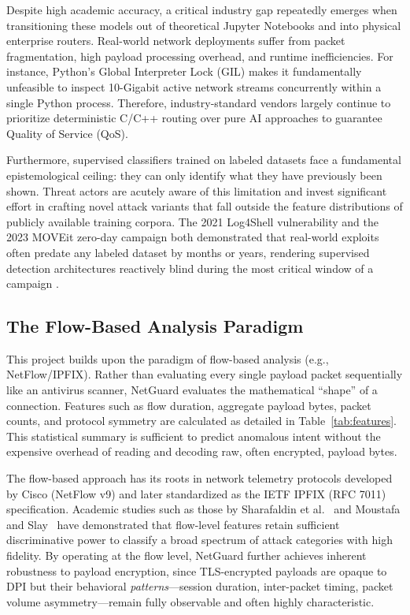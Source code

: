 \documentclass[conference]{IEEEtran}
\begin{document}
Despite high academic accuracy, a critical industry gap repeatedly emerges when transitioning these models out of theoretical Jupyter Notebooks and into physical enterprise routers. Real-world network deployments suffer from packet fragmentation, high payload processing overhead, and runtime inefficiencies. For instance, Python's Global Interpreter Lock (GIL) makes it fundamentally unfeasible to inspect 10-Gigabit active network streams concurrently within a single Python process. Therefore, industry-standard vendors largely continue to prioritize deterministic C/C++ routing over pure AI approaches to guarantee Quality of Service (QoS).

Furthermore, supervised classifiers trained on labeled datasets face a fundamental epistemological ceiling: they can only identify what they have previously been shown. Threat actors are acutely aware of this limitation and invest significant effort in crafting novel attack variants that fall outside the feature distributions of publicly available training corpora. The 2021 Log4Shell vulnerability and the 2023 MOVEit zero-day campaign both demonstrated that real-world exploits often predate any labeled dataset by months or years, rendering supervised detection architectures reactively blind during the most critical window of a campaign \cite{ring2019, hindy2020}.

\subsection{The Flow-Based Analysis Paradigm}
This project builds upon the paradigm of flow-based analysis (e.g., NetFlow/IPFIX). Rather than evaluating every single payload packet sequentially like an antivirus scanner, NetGuard evaluates the mathematical ``shape'' of a connection. Features such as flow duration, aggregate payload bytes, packet counts, and protocol symmetry are calculated as detailed in Table~\ref{tab:features}. This statistical summary is sufficient to predict anomalous intent without the expensive overhead of reading and decoding raw, often encrypted, payload bytes.

The flow-based approach has its roots in network telemetry protocols developed by Cisco (NetFlow v9) and later standardized as the IETF IPFIX (RFC 7011) specification. Academic studies such as those by Sharafaldin et al.~\cite{sharafaldin2018} and Moustafa and Slay~\cite{moustafa2015} have demonstrated that flow-level features retain sufficient discriminative power to classify a broad spectrum of attack categories with high fidelity. By operating at the flow level, NetGuard further achieves inherent robustness to payload encryption, since TLS-encrypted payloads are opaque to DPI but their behavioral \emph{patterns}---session duration, inter-packet timing, packet volume asymmetry---remain fully observable and often highly characteristic.
\end{document}
